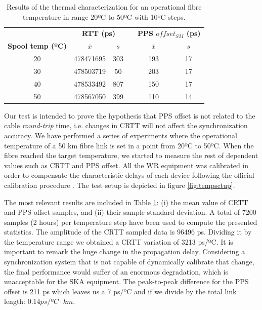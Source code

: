 \begin{table}\centering
	\begin{tabular}{@{} cccccc@{}}%
		& \multicolumn{2}{c}{\bfseries{RTT (ps)}} & &
		\multicolumn{2}{c}{\bfseries{PPS $offset_{SM}$ (ps)}} \\
		\cmidrule(l){2-3}  \cmidrule{5-6}
		\textbf{Spool temp (ºC)} & $\overline{x}$ & $s$ & & $\overline{x}$ 
		& $s$ \\ \midrule
		\small{20} & 478471695 & 303 & & 193 & 17 \\
		\small{30} & 478503719 & 50  & & 203 & 17 \\
		\small{40} & 478533492 & 807 & & 150 & 17 \\
		\small{50} & 478567050 & 399 & & 110 & 14 \\
		\bottomrule
	\end{tabular}
	\caption{Results of the thermal characterization for an operational fibre 
		temperature in range 20ºC to 50ºC with 10ºC steps.}
	\label{tab:temp}
\end{table}

Our test is intended to prove the hypothesis that PPS offset is not related to 
the cable \textit{round-trip} time, i.e. changes in CRTT will not affect the 
synchronization accuracy. We have performed a series of experiments where the 
operational temperature of a 50 km fibre link is set in a point from 20ºC to 
50ºC. When the fibre reached the target temperature, we started to measure the 
rest of dependent values such as CRTT and PPS offset. All the WR equipment was 
calibrated in order to compensate the characteristic delays of each device 
following the official calibration procedure \cite{man:calib}.  The test setup 
is depicted in figure \ref{fig:tempsetup}.

The most relevant results are included in Table \ref{tab:temp}: (i) the mean 
value of CRTT and PPS offset samples, and (ii) their sample standard deviation. 
A total of 7200 samples (2 hours) per temperature step have been used to 
compute the presented statistics. The amplitude of the CRTT sampled data is 
96496 ps. Dividing it by the temperature range we obtained a CRTT variation of 
3213 ps/ºC. It is important to remark the huge change in the propagation delay. 
Considering a synchronization system that is not capable of dynamically 
calibrate that change, the final performance would suffer of an enormous 
degradation, which is unacceptable for the SKA equipment. The peak-to-peak 
difference for the PPS offset is 211 ps which leaves us a 7 ps/ºC and if we 
divide by the total link length: $0.14 ps/ºC \cdot km$.

